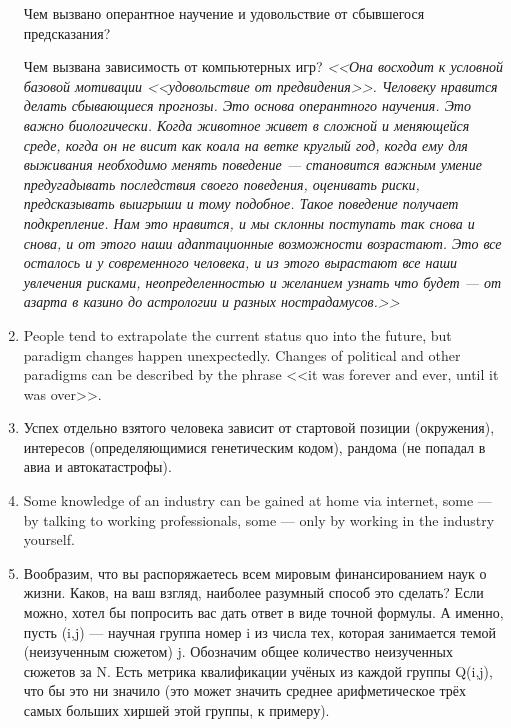 \documentclass[11pt]{article}
\theoremstyle{remark}
\theoremstyle{definition}
\begin{document}
\begin{enumerate}
Чем вызвано оперантное научение и удовольствие от сбывшегося предсказания?


Чем вызвана зависимость от компьютерных игр? \textit{<<Она восходит к условной базовой мотивации <<удовольствие от предвидения>>. Человеку нравится делать сбывающиеся прогнозы. Это основа оперантного научения. Это важно биологически. Когда животное живет в сложной и меняющейся среде, когда он не висит как коала на ветке круглый год, когда ему для выживания необходимо менять поведение --- становится важным умение предугадывать последствия своего поведения, оценивать риски, предсказывать выигрыши и тому подобное. Такое поведение получает подкрепление. Нам это нравится, и мы склонны поступать так снова и снова, и от этого наши адаптационные возможности возрастают. Это все осталось и у современного человека, и из этого вырастают все наши увлечения рисками, неопределенностью и желанием узнать что будет --- от азарта в казино до астрологии и разных нострадамусов.>>}



\item People tend to extrapolate the current status quo into the future, but paradigm changes happen unexpectedly. Changes of political and other paradigms can be described by the phrase <<it was forever and ever, until it was over>>.



\item Успех отдельно взятого человека зависит от стартовой позиции (окружения), интересов (определяющимися генетическим кодом), рандома (не попадал в авиа и автокатастрофы).



\item Some knowledge of an industry can be gained at home via internet, some --- by talking to working professionals, some --- only by working in the industry yourself.

\item Вообразим, что вы распоряжаетесь всем мировым финансированием наук о жизни. Каков, на ваш взгляд, наиболее разумный способ это сделать? Если можно, хотел бы попросить вас дать ответ в виде точной формулы. А именно, пусть (i,j) — научная группа номер i из числа тех, которая занимается темой (неизученным сюжетом) j. Обозначим общее количество неизученных сюжетов за N. Есть метрика квалификации учёных из каждой группы Q(i,j), что бы это ни значило (это может значить среднее арифметическое трёх самых больших хиршей этой группы, к примеру).


\end{enumerate}
\end{document}
